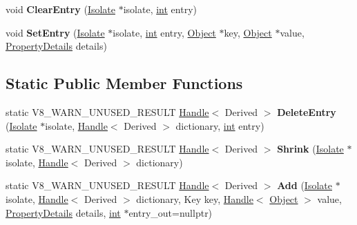 \begin{DoxyCompactItemize}
void {\bfseries Clear\+Entry} (\mbox{\hyperlink{classv8_1_1internal_1_1Isolate}{Isolate}} $\ast$isolate, \mbox{\hyperlink{classint}{int}} entry)
\item 
\mbox{\label{classv8_1_1internal_1_1Dictionary_a3297264870378efce3e3f426ee03b9fe}} 
void {\bfseries Set\+Entry} (\mbox{\hyperlink{classv8_1_1internal_1_1Isolate}{Isolate}} $\ast$isolate, \mbox{\hyperlink{classint}{int}} entry, \mbox{\hyperlink{classv8_1_1internal_1_1Object}{Object}} $\ast$key, \mbox{\hyperlink{classv8_1_1internal_1_1Object}{Object}} $\ast$value, \mbox{\hyperlink{classv8_1_1internal_1_1PropertyDetails}{Property\+Details}} details)
\end{DoxyCompactItemize}
\subsection*{Static Public Member Functions}
\begin{DoxyCompactItemize}
\item 
\mbox{\label{classv8_1_1internal_1_1Dictionary_af0b987fea2511f1f605af8fed2010b09}} 
static V8\+\_\+\+W\+A\+R\+N\+\_\+\+U\+N\+U\+S\+E\+D\+\_\+\+R\+E\+S\+U\+LT \mbox{\hyperlink{classv8_1_1internal_1_1Handle}{Handle}}$<$ Derived $>$ {\bfseries Delete\+Entry} (\mbox{\hyperlink{classv8_1_1internal_1_1Isolate}{Isolate}} $\ast$isolate, \mbox{\hyperlink{classv8_1_1internal_1_1Handle}{Handle}}$<$ Derived $>$ dictionary, \mbox{\hyperlink{classint}{int}} entry)
\item 
\mbox{\label{classv8_1_1internal_1_1Dictionary_ab6e61f969a50c7a5dd292ff011d601ef}} 
static V8\+\_\+\+W\+A\+R\+N\+\_\+\+U\+N\+U\+S\+E\+D\+\_\+\+R\+E\+S\+U\+LT \mbox{\hyperlink{classv8_1_1internal_1_1Handle}{Handle}}$<$ Derived $>$ {\bfseries Shrink} (\mbox{\hyperlink{classv8_1_1internal_1_1Isolate}{Isolate}} $\ast$isolate, \mbox{\hyperlink{classv8_1_1internal_1_1Handle}{Handle}}$<$ Derived $>$ dictionary)
\item 
\mbox{\label{classv8_1_1internal_1_1Dictionary_a5d5e423f219f9489e5948fddb815a76f}} 
static V8\+\_\+\+W\+A\+R\+N\+\_\+\+U\+N\+U\+S\+E\+D\+\_\+\+R\+E\+S\+U\+LT \mbox{\hyperlink{classv8_1_1internal_1_1Handle}{Handle}}$<$ Derived $>$ {\bfseries Add} (\mbox{\hyperlink{classv8_1_1internal_1_1Isolate}{Isolate}} $\ast$isolate, \mbox{\hyperlink{classv8_1_1internal_1_1Handle}{Handle}}$<$ Derived $>$ dictionary, Key key, \mbox{\hyperlink{classv8_1_1internal_1_1Handle}{Handle}}$<$ \mbox{\hyperlink{classv8_1_1internal_1_1Object}{Object}} $>$ value, \mbox{\hyperlink{classv8_1_1internal_1_1PropertyDetails}{Property\+Details}} details, \mbox{\hyperlink{classint}{int}} $\ast$entry\+\_\+out=nullptr)
\end{DoxyCompactItemize}
